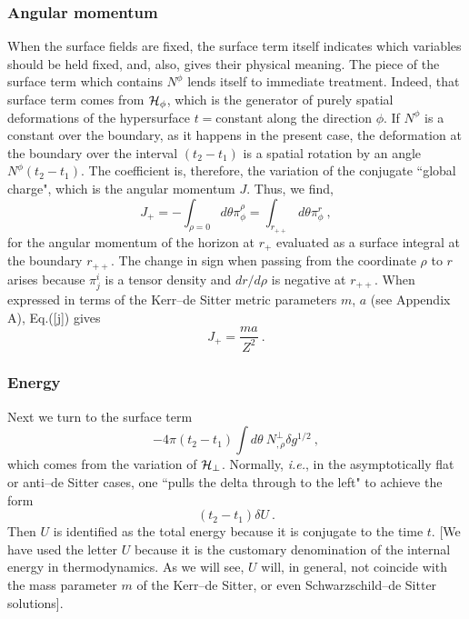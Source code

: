 \documentclass[a4paper,preprintnumbers,amsmath,amssymb]{revtex4}
\begin{document}
\subsubsection*{Angular momentum}
When the surface fields are fixed, the surface term itself indicates which
variables should be held fixed, and, also, gives their physical meaning.
The piece of the surface term which contains $N^{\phi}$ lends itself to immediate
treatment. Indeed, that surface term comes from ${\cal H}_\phi$, which is the generator
of purely spatial deformations of the hypersurface $t=$constant along the direction $\phi$. If
$N^{\phi}$ is a constant over the boundary, as it happens in the present case, the deformation at the boundary
over the interval $(t_2-t_1)$ is a spatial rotation by an angle
$N^{\phi}(t_2-t_1)$.
The coefficient is, therefore, the variation of the conjugate ``global charge", which is the angular momentum $J$.
Thus, we find,
\begin{equation}
J_+ = -\int_{\rho=0} d\theta \pi^{\rho}_{\phi} =
\int_{r_{++}} d\theta \pi^{r}_{\phi} \ ,
\label{j}
\end{equation}
for the angular momentum of the horizon at $r_+$ evaluated as a surface integral
at the boundary $r_{++}$. The change in sign when passing from
the coordinate $\rho$ to $r$ arises because $ \pi^{i}_{j}$ is a tensor
density and $dr/d\rho$ is negative at $r_{++}$.
When expressed in terms of the Kerr--de Sitter metric
parameters $m$, $a$ (see Appendix A), Eq.(\ref{j}) gives
\begin{equation}
J_+ = \frac{ma}{Z^2} \ .
\label{jkerr}
\end{equation}

\subsubsection*{Energy}

Next we turn to the surface term
\begin{equation}
-4\pi(t_2-t_1)\int d\theta \ N^{\perp}_{,\rho} \delta g^{1/2} \ ,
\label{energy}
\end{equation}
which comes from the variation of ${\cal H}_{\perp}$. Normally, {\it i.e.},
in the asymptotically flat or anti--de Sitter cases, one ``pulls the delta through to the left" to achieve the form
\begin{equation}
(t_2-t_1) \delta U \ .
\label{e}
\end{equation}
Then $U$ is identified as the total energy because it is conjugate
to the time $t$. [We have used the letter $U$ because it is the customary denomination
of the internal energy in thermodynamics. As we will see, $U$ will, in general,
not coincide with the mass parameter $m$ of the Kerr--de Sitter, or even
Schwarzschild--de Sitter solutions].
\end{document}
